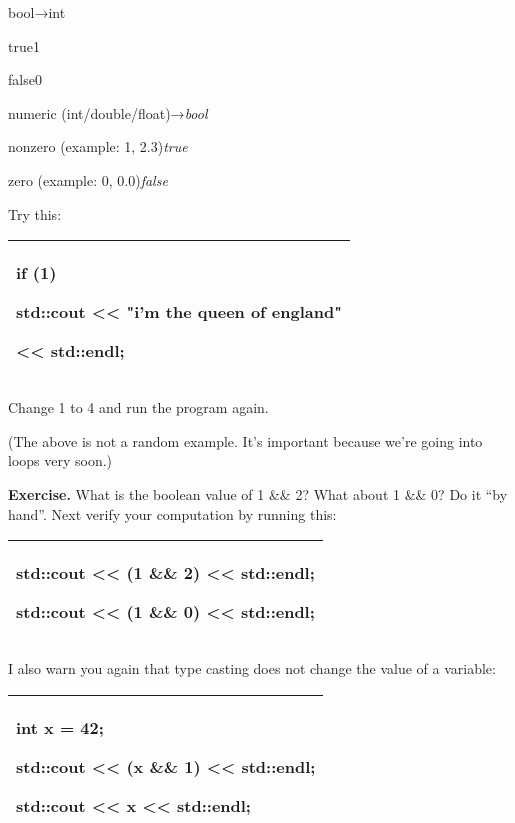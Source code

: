 \documentclass[
]{article}
\begin{document}
bool→int

true1

false0

numeric (int/double/float)→\emph{bool}

nonzero (example: 1, 2.3)\emph{true}

zero (example: 0, 0.0)\emph{false}

Try this:

\begin{longtable}[]{@{}l@{}}
\toprule
\endhead
\begin{minipage}[t]{0.97\columnwidth}\raggedright
if (1)

std::cout \textless\textless{} "i'm the queen of england"

\textless\textless{} std::endl;\strut
\end{minipage}\tabularnewline
\bottomrule
\end{longtable}

Change 1 to 4 and run the program again.

(The above is not a random example. It's important because we're going
into loops very soon.)

\textbf{Exercise.} What is the boolean value of 1 \&\& 2? What about 1
\&\& 0? Do it ``by hand''. Next verify your computation by running this:

\begin{longtable}[]{@{}l@{}}
\toprule
\endhead
\begin{minipage}[t]{0.97\columnwidth}\raggedright
std::cout \textless\textless{} (1 \&\& 2) \textless\textless{}
std::endl;

std::cout \textless\textless{} (1 \&\& 0) \textless\textless{}
std::endl;\strut
\end{minipage}\tabularnewline
\bottomrule
\end{longtable}

I also warn you again that type casting does not change the value of a
variable:

\begin{longtable}[]{@{}l@{}}
\toprule
\endhead
\begin{minipage}[t]{0.97\columnwidth}\raggedright
int x = 42;

std::cout \textless\textless{} (x \&\& 1) \textless\textless{}
std::endl;

std::cout \textless\textless{} x \textless\textless{} std::endl;\strut
\end{minipage}\tabularnewline
\bottomrule
\end{longtable}
\end{document}
